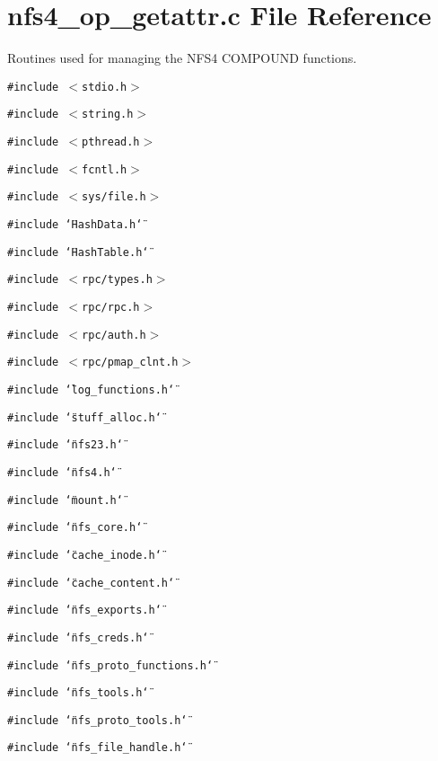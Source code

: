 \section{nfs4\_\-op\_\-getattr.c File Reference}
\label{nfs4__op__getattr_8c}
Routines used for managing the NFS4 COMPOUND functions. 

{\tt \#include $<$stdio.h$>$}\par
{\tt \#include $<$string.h$>$}\par
{\tt \#include $<$pthread.h$>$}\par
{\tt \#include $<$fcntl.h$>$}\par
{\tt \#include $<$sys/file.h$>$}\par
{\tt \#include \char`\"{}Hash\-Data.h\char`\"{}}\par
{\tt \#include \char`\"{}Hash\-Table.h\char`\"{}}\par
{\tt \#include $<$rpc/types.h$>$}\par
{\tt \#include $<$rpc/rpc.h$>$}\par
{\tt \#include $<$rpc/auth.h$>$}\par
{\tt \#include $<$rpc/pmap\_\-clnt.h$>$}\par
{\tt \#include \char`\"{}log\_\-functions.h\char`\"{}}\par
{\tt \#include \char`\"{}stuff\_\-alloc.h\char`\"{}}\par
{\tt \#include \char`\"{}nfs23.h\char`\"{}}\par
{\tt \#include \char`\"{}nfs4.h\char`\"{}}\par
{\tt \#include \char`\"{}mount.h\char`\"{}}\par
{\tt \#include \char`\"{}nfs\_\-core.h\char`\"{}}\par
{\tt \#include \char`\"{}cache\_\-inode.h\char`\"{}}\par
{\tt \#include \char`\"{}cache\_\-content.h\char`\"{}}\par
{\tt \#include \char`\"{}nfs\_\-exports.h\char`\"{}}\par
{\tt \#include \char`\"{}nfs\_\-creds.h\char`\"{}}\par
{\tt \#include \char`\"{}nfs\_\-proto\_\-functions.h\char`\"{}}\par
{\tt \#include \char`\"{}nfs\_\-tools.h\char`\"{}}\par
{\tt \#include \char`\"{}nfs\_\-proto\_\-tools.h\char`\"{}}\par
{\tt \#include \char`\"{}nfs\_\-file\_\-handle.h\char`\"{}}\par
